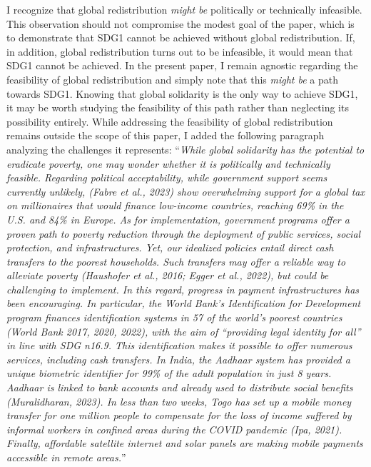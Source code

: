 \documentclass[12pt,english]{article}
\begin{document}
I recognize that global redistribution \textit{might be} politically or technically infeasible. This observation should not compromise the modest goal of the paper, which is to demonstrate that SDG1 cannot be achieved without global redistribution. If, in addition, global redistribution turns out to be infeasible, it would mean that SDG1 cannot be achieved. In the present paper, I remain agnostic regarding the feasibility of global redistribution and simply note that this \textit{might be} a path towards SDG1. Knowing that global solidarity is the only way to achieve SDG1, it may be worth studying the feasibility of this path rather than neglecting its possibility entirely. 
While addressing the feasibility of global redistribution remains outside the scope of this paper, I added the following paragraph analyzing the challenges it represents: 
``\textit{While global solidarity has the potential to eradicate poverty, one may wonder whether it is politically and technically feasible. 
Regarding political acceptability, while government support seems currently unlikely, (Fabre et al., 2023) show overwhelming support for a global tax on millionaires that would finance low-income countries, reaching 69\% in the U.S. and 84\% in Europe. %
As for implementation, government programs offer a proven path to poverty reduction through the deployment of public services, social protection, and infrastructures. 
Yet, our idealized policies entail direct cash transfers to the poorest households. Such transfers may offer a reliable way to alleviate poverty (Haushofer et al., 2016; Egger et al., 2022), but could be challenging to implement. In this regard, progress in payment infrastructures has been encouraging. In particular, the World Bank's \textit{Identification for Development} program finances identification systems in 57 of the world's poorest countries (World Bank 2017, 2020, 2022), with the aim of ``providing legal identity for all'' in line with SDG n\textdegree{}16.9. This identification makes it possible to offer numerous services, including cash transfers. In India, the Aadhaar system has provided a unique biometric identifier for 99\% of the adult population in just 8 years. Aadhaar is linked to bank accounts and already used to distribute social benefits (Muralidharan, 2023). In less than two weeks, Togo has set up a mobile money transfer for one million people to compensate for the loss of income suffered by informal workers in confined areas during the COVID pandemic (Ipa, 2021). Finally, affordable satellite internet and solar panels are making mobile payments accessible in remote areas.}''
~\\ ~\\
\end{document}

